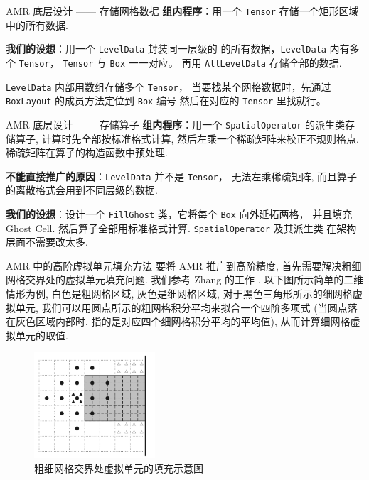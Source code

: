 \documentclass[10pt]{beamer}
\begin{document}
\begin{frame}[fragile]{AMR 底层设计 —— 存储网格数据}
    \footnotesize
    \textbf{组内程序}：用一个 \verb|Tensor| 存储一个矩形区域中的所有数据.

    \vspace{1em}
    \textbf{我们的设想}：用一个 \verb|LevelData| 封装同一层级的
    的所有数据，\verb|LevelData| 内有多个 \verb|Tensor|，
    \verb|Tensor| 与 \verb|Box| 一一对应。
    再用 \verb|AllLevelData| 存储全部的数据.

    \vspace{1em}
    \verb|LevelData| 内部用数组存储多个 \verb|Tensor|，
    当要找某个网格数据时，先通过 \verb|BoxLayout| 的成员方法定位到 \verb|Box| 编号
    然后在对应的 \verb|Tensor| 里找就行。
\end{frame}

\begin{frame}[fragile]{AMR 底层设计 —— 存储算子}
    \footnotesize
    \textbf{组内程序}：用一个 \verb|SpatialOperator| 的派生类存储算子, 
    计算时先全部按标准格式计算, 然后左乘一个稀疏矩阵来校正不规则格点.
    稀疏矩阵在算子的构造函数中预处理.

    \vspace{1em}
    \textbf{不能直接推广的原因}：\verb|LevelData| 并不是 \verb|Tensor|，
    无法左乘稀疏矩阵, 而且算子的离散格式会用到不同层级的数据.

    \vspace{1em}
    \textbf{我们的设想}：设计一个 \verb|FillGhost| 类，它将每个 \verb|Box| 向外延拓两格，
    并且填充 Ghost Cell. 然后算子全部用标准格式计算. \verb|SpatialOperator| 及其派生类
    在架构层面不需要改太多.
\end{frame}

\begin{frame}[fragile]{AMR 中的高阶虚拟单元填充方法}
    \footnotesize
    要将 AMR 推广到高阶精度, 首先需要解决粗细网格交界处的虚拟单元填充问题.
    我们参考 Zhang 的工作\cite{Zhang2011} .
    以下图所示简单的二维情形为例, 白色是粗网格区域,
    灰色是细网格区域, 对于黑色三角形所示的细网格虚拟单元,
    我们可以用圆点所示的粗网格积分平均来拟合一个四阶多项式
    (当圆点落在灰色区域内部时, 指的是对应四个细网格积分平均的平均值),
    从而计算细网格虚拟单元的取值.
    
    \begin{figure}[H]
        \centering
        \includegraphics[width=0.4\textwidth]{jpg/fillGhost.jpeg}
        \caption{粗细网格交界处虚拟单元的填充示意图\cite{Zhang2011}}
    \end{figure}
\end{frame}
\end{document}

